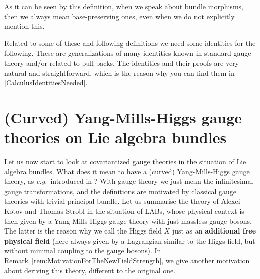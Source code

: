 \documentclass[preprint]{elsarticle}
\theoremstyle{plain}
\theoremstyle{remark}
\theoremstyle{definition}
\begin{document}
As it can be seen by this definition, when we speak about bundle morphisms, then we always mean base-preserving ones, even when we do not explicitly mention this.

Related to some of these and following definitions we need some identities for the following. These are generalizations of many identities known in standard gauge theory and/or related to pull-backs. The identities and their proofs are very natural and straightforward, which is the reason why you can find them in \ref{CalculusIdentitiesNeeded}.

%
\section{(Curved) Yang-Mills-Higgs gauge theories on Lie algebra bundles} \label{CYMHGTWITHLABS}

Let us now start to look at covariantized gauge theories in the situation of Lie algebra bundles. What does it mean to have a (curved) Yang-Mills-Higgs gauge theory, as \textit{e.g.}~introduced in \cite[and the references therein]{CurvedYMH}? With gauge theory we just mean the infinitesimal gauge transformations, and the definitions are motivated by classical gauge theories with trivial principal bundle. Let us summarise the theory of Alexei Kotov and Thomas Strobl in the situation of LABs, whose physical context is then given by a Yang-Mills-Higgs gauge theory with just massless gauge bosons. The latter is the reason why we call the Higgs field $X$ just as an \textbf{additional free physical field} (here always given by a Lagrangian similar to the Higgs field, but without minimal coupling to the gauge bosons). In Remark~\ref{rem:MotivationForTheNewFieldStrength}, we give another motivation about deriving this theory, different to the original one.
\end{document}
